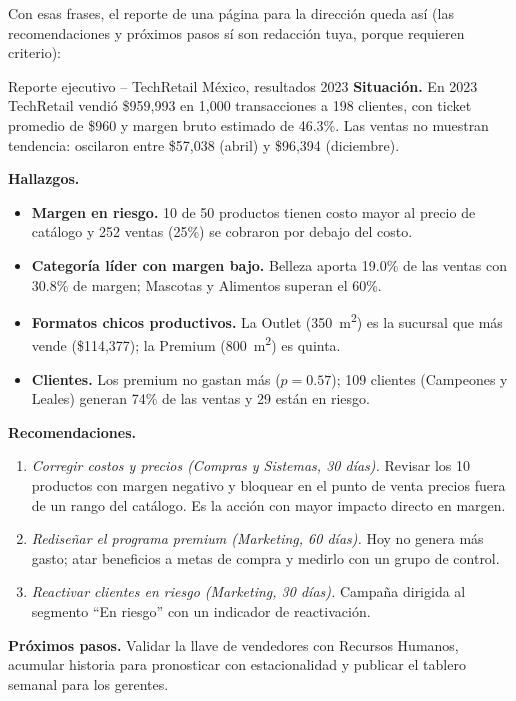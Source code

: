 Con esas frases, el reporte de una página para la dirección queda así (las
recomendaciones y próximos pasos sí son redacción tuya, porque requieren
criterio):

\begin{negocio}{Reporte ejecutivo -- TechRetail México, resultados 2023}
\textbf{Situación.} En 2023 TechRetail vendió \$959,993 en 1,000
transacciones a 198 clientes, con ticket promedio de \$960 y margen bruto
estimado de 46.3\%. Las ventas no muestran tendencia: oscilaron entre
\$57,038 (abril) y \$96,394 (diciembre).

\textbf{Hallazgos.}
\begin{itemize}
  \item \textbf{Margen en riesgo.} 10 de 50 productos tienen costo mayor al
        precio de catálogo y 252 ventas (25\%) se cobraron por debajo del
        costo.
  \item \textbf{Categoría líder con margen bajo.} Belleza aporta 19.0\% de las
        ventas con 30.8\% de margen; Mascotas y Alimentos superan el 60\%.
  \item \textbf{Formatos chicos productivos.} La Outlet (350~m\textsuperscript{2})
        es la sucursal que más vende (\$114,377); la Premium
        (800~m\textsuperscript{2}) es quinta.
  \item \textbf{Clientes.} Los premium no gastan más ($p = 0.57$); 109
        clientes (Campeones y Leales) generan 74\% de las ventas y 29 están
        en riesgo.
\end{itemize}

\textbf{Recomendaciones.}
\begin{enumerate}
  \item \emph{Corregir costos y precios (Compras y Sistemas, 30 días).}
        Revisar los 10 productos con margen negativo y bloquear en el punto
        de venta precios fuera de un rango del catálogo. Es la acción con
        mayor impacto directo en margen.
  \item \emph{Rediseñar el programa premium (Marketing, 60 días).} Hoy no
        genera más gasto; atar beneficios a metas de compra y medirlo con un
        grupo de control.
  \item \emph{Reactivar clientes en riesgo (Marketing, 30 días).} Campaña
        dirigida al segmento ``En riesgo'' con un indicador de reactivación.
\end{enumerate}

\textbf{Próximos pasos.} Validar la llave de vendedores con Recursos
Humanos, acumular historia para pronosticar con estacionalidad y publicar el
tablero semanal para los gerentes.
\end{negocio}


